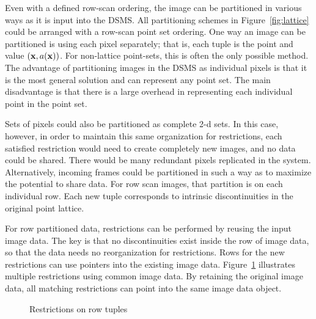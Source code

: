 \documentclass{ucdthesis}       %
\begin{document}
Even with a defined row-scan ordering, the image can be partitioned in
various ways as it is input into the \ac{DSMS}.  All partitioning
schemes in Figure~\ref{fig:lattice} could be arranged with a row-scan
point set ordering.  One way an image can be partitioned is using each
pixel separately; that is, each tuple is the point and value
$({\bf{x}},a({\bf{x}}))$.  For non-lattice point-sets, this is often the
only possible method.  The advantage of partitioning images in the
\ac{DSMS} as individual pixels is that it is the most general solution
and can represent any point set.  The main disadvantage is that
there is a large overhead in representing each individual point in the
point set.

Sets of pixels could also be partitioned as complete 2-d sets.  In
this case, however, in order to maintain this same organization for
restrictions, each satisfied restriction would need to create
completely new images, and no data could be shared.  There would be
many redundant pixels replicated in the system.  Alternatively,
incoming frames could be partitioned in such a way as to maximize the
potential to share data.  For row scan images, that partition is on
each individual row.  Each new tuple corresponds to intrinsic
discontinuities in the original point lattice.

For row partitioned data, restrictions can be performed by reusing the
input image data.  The key is that no discontinuities exist inside the
row of image data, so that the data needs no reorganization for
restrictions.  Rows for the new restrictions can use pointers into the
existing image data.  Figure~\ref{fig:chunk} illustrates multiple
restrictions using common image data.  By retaining the original image
data, all matching restrictions can point into the same image data
object.

\begin{figure}[htb]
  \centering
  {
    \quad
 }
 \caption{Restrictions on row tuples}
 \label{fig:chunk}
\end{figure}
\end{document}
